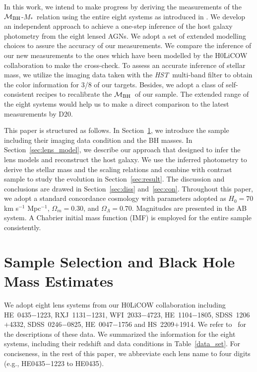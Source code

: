 \documentclass[fleqn,usenatbib]{mnras}
\newcommand{\hst}{{\it HST}}
\newcommand{\mbh}{$\mathcal M_{\rm BH}$}
\newcommand{\mstar}{{$M_*$}}
\begin{document}
In this work, we intend to make progress by deriving the measurements of the \mbh-\mstar\ relation using the entire eight systems as introduced in \citet{Ding2017a}. We develop an independent approach to achieve a one-step inference of the host galaxy photometry from the eight lensed AGNs. We adopt a set of extended modelling choices to assure the accuracy of our measurements. We compare the inference of our new measurements to the ones which have been modelled by the H0LiCOW collaboration to make the cross-check. To assess an accurate inference of stellar mass, we utilize the imaging data taken with the \hst\ multi-band filter to obtain the color information for 3/8 of our targets. Besides, we adopt a class of self-consistent recipes to recalibrate the \mbh\ of our sample. The extended range of the eight systems would help us to make a direct comparison to the latest measurements by D20. 

This paper is structured as follows. In Section~\ref{sec:sample_select}, we introduce the sample including their imaging data condition and the BH masses. In Section~\ref{sec:lens_model}, we describe our approach that designed to infer the lens models and reconstruct the host galaxy. We use the inferred photometry to derive the stellar mass and the scaling relations and combine with contrast sample to study the evolution in Section~\ref{sec:result}. The discussion and conclusions are drawed in Section~\ref{sec:diss} and~\ref{sec:con}. Throughout this paper, we adopt a standard concordance cosmology with parameters adopted as $H_0= 70$ km s$^{-1}$ Mpc$^{-1}$, $\Omega{_m} = 0.30$, and $\Omega{_\Lambda} = 0.70$. Magnitudes are presented in the AB system. A Chabrier initial mass function (IMF) is employed for the entire sample consistently.

\section{Sample Selection and Black Hole Mass Estimates}\label{sec:sample_select}
We adopt eight lens systems from our H0LiCOW collaboration including HE~0435$-$1223, RXJ~1131$-$1231, WFI~2033$-$4723, HE~1104$-$1805, SDSS~1206$+$4332, SDSS~0246$-$0825, HE~0047$-$1756 and HS~2209$+$1914. We refer to~\citet{Suyu2017, Ding2017a} for the descriptions of these data. We summarized the information for the eight systems, including their redshift and data conditions in Table~\ref{data_set}.
For conciseness, in the rest of this paper, we abbreviate each lens name to four digits (e.g., HE0435$-$1223 to HE0435). 
\end{document}
